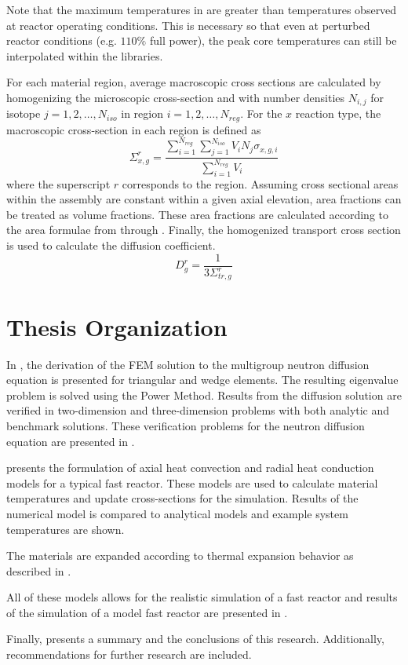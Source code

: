   Note that the maximum temperatures in  are greater than 
  temperatures observed at reactor operating conditions. This is necessary so 
  that even at perturbed reactor conditions (e.g. $110\%$ full power), the peak 
  core temperatures can still be interpolated within the libraries.

  For each material region, average macroscopic cross
  sections are calculated by homogenizing the microscopic cross-section and with 
  number densities $N_{i,j}$ for isotope ${j=1,2,\ldots,N_{iso}}$ in region
  ${i=1,2,\ldots,N_{reg}}$.  For the $x$ reaction type, the 
  macroscopic cross-section in each region is defined as
  \begin{equation}
    \Sigma_{x,g}^r = \frac{\sum_{i=1}^{N_{reg}} \sum_{j=1}^{N_{iso}} V_i N_{j} 
      \sigma_{x,g,i}} {\sum_{i=1}^{N_{reg}}V_i}
  \end{equation}
  where the superscript $r$ corresponds to the region. Assuming cross sectional
  areas within the assembly are constant within a given axial elevation, area
  fractions can be treated as volume fractions. These area fractions are
  calculated according to the area formulae from  through
  . Finally, the homogenized transport cross section is used 
  to calculate the diffusion coefficient.
  \begin{equation}
    D_g^r = \frac{1}{3 \Sigma_{tr,g}^r}
  \end{equation}

\section{Thesis Organization}
  In , the derivation of the FEM solution to the
  multigroup neutron diffusion equation is
  presented for triangular and wedge elements. The resulting eigenvalue problem
  is solved using the Power Method. Results from the diffusion solution are
  verified in two-dimension and three-dimension problems with both analytic and
  benchmark solutions. These verification problems for the neutron diffusion
  equation are presented in .

   presents the formulation of axial heat convection
  and radial heat conduction models for a typical fast reactor. These models are 
  used to calculate material temperatures and update cross-sections for the 
  simulation.  Results of the numerical model is compared to analytical models 
  and example system temperatures are shown.

  The materials are expanded according to thermal expansion behavior as
  described in . 
  
  All of these models allows for the realistic simulation of a fast reactor and 
  results of the simulation of a model fast reactor are presented in 
  .
 
  Finally,  presents a 
  summary and the conclusions of this research. Additionally, recommendations 
  for further research are included.

